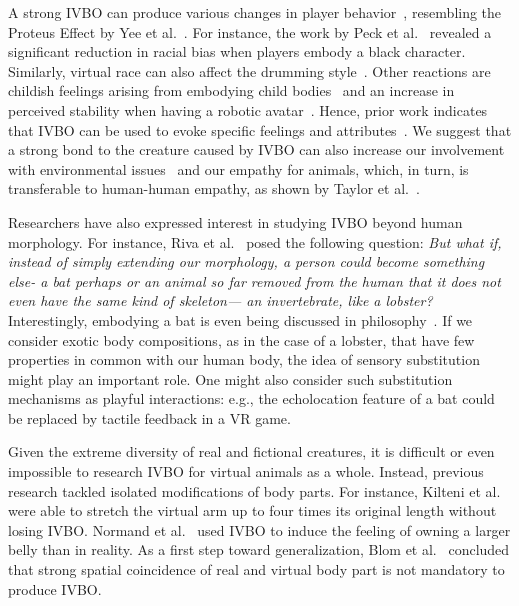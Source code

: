 \documentclass{sigchi}
\begin{document}
A strong IVBO can produce various changes in player behavior~, resembling the Proteus Effect by Yee et al.~. For instance, the work by Peck et al.~ revealed a significant reduction in racial bias when players embody a black character. Similarly, virtual race can also affect the drumming style~\cite{kilteni2013drumming}. Other reactions are childish feelings arising from embodying child bodies~\cite{banakou2013illusory} and an increase in perceived stability when having a robotic avatar~\cite{lugrin2016avatar}. Hence, prior work indicates that IVBO can be used to evoke specific feelings and attributes~\cite{kors2016breathtaking}. We suggest that a strong bond to the creature caused by IVBO can also increase our involvement with environmental issues~\cite{ahn2016experiencing,berenguer2007effect} and our empathy for animals, which, in turn, is transferable to human-human empathy, as shown by Taylor et al.~.

Researchers have also expressed interest in studying IVBO beyond human morphology. For instance, Riva et al.~ posed the following question: \textit{But what if, instead of simply extending our morphology, a person could become something else- a bat perhaps or an animal so far removed from the human that it does not even have the same kind of skeleton— an invertebrate, like a lobster?} Interestingly, embodying a bat is even being discussed in philosophy~\cite{nagel1974like}. If we consider exotic body compositions, as in the case of a lobster, that have few properties in common with our human body, the idea of sensory substitution~\cite{bach2003sensory} might play an important role. One might also consider such substitution mechanisms as playful interactions: e.g., the echolocation feature of a bat could be replaced by tactile feedback in a VR game.

Given the extreme diversity of real and fictional creatures, it is difficult or even impossible to research IVBO for virtual animals as a whole. Instead, previous research tackled isolated modifications of body parts. For instance, Kilteni et al.~ were able to stretch the virtual arm up to four times its original length without losing IVBO. Normand et al.~ used IVBO to induce the feeling of owning a larger belly than in reality. As a first step toward generalization, Blom et al.~ concluded that strong spatial coincidence of real and virtual body part is not mandatory to produce IVBO.
\end{document}
